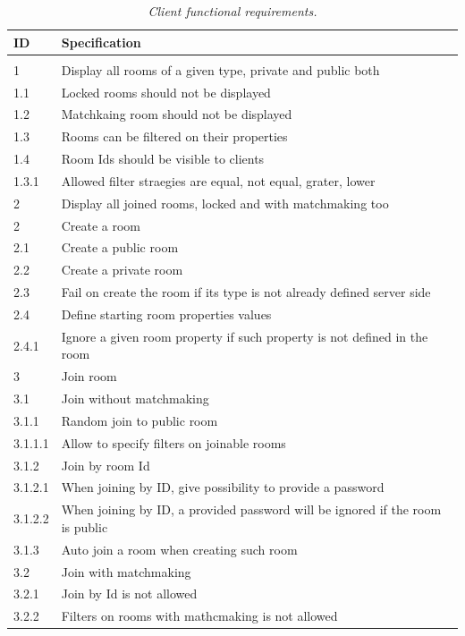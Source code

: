 \begin{center}
  \begin{longtable}{|l|l|} 
    \caption{\textit{Client functional requirements.}} \label{table:client-f-req} \\
 
\hline
ID   &  Specification \\
\hline
\multicolumn{2}{|c|}{} \\
\hline
1       & Display all rooms of a given type, private and public both \\
1.1     & Locked rooms should not be displayed \\
1.2     & Matchkaing room should not be displayed \\
1.3     & Rooms can be filtered on their properties \\
1.4     & Room Ids should be visible to clients \\
1.3.1   & Allowed filter straegies are equal, not equal, grater, lower \\
2       & Display all joined rooms, locked and with matchmaking too \\
2       & Create a room \\
2.1     & Create a public room \\
2.2     & Create a private room \\
2.3     & Fail on  create the room if its type is not already defined server side \\
2.4     & Define starting room properties values \\
2.4.1   & Ignore a given room property if such property is not defined in the room \\
3       & Join room \\
3.1     & Join without matchmaking \\
3.1.1   & Random join to public room \\
3.1.1.1 & Allow to specify filters on joinable rooms \\
3.1.2   & Join by room Id \\
3.1.2.1 & When joining by ID, give possibility to provide a password \\
3.1.2.2 & When joining by ID, a provided password will be ignored if the room is public \\
3.1.3   & Auto join a room when creating such room \\
3.2     & Join with matchmaking \\
3.2.1   & Join by Id is not allowed \\
3.2.2   & Filters on rooms with mathcmaking is not allowed \\

\end{longtable}
\end{center}
